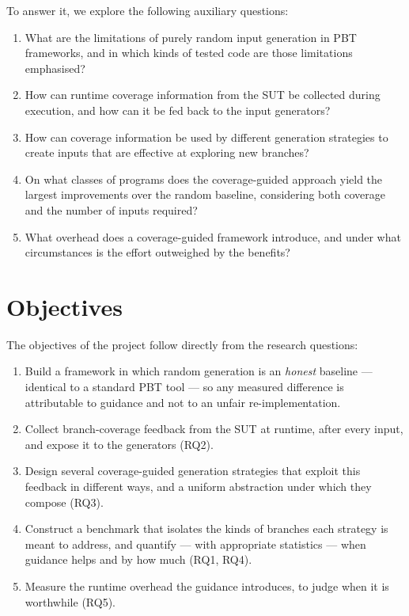 \documentclass[11pt,a4paper]{report}
\begin{document}
To answer it, we explore the following auxiliary questions:
\begin{enumerate}[label=RQ\arabic*., leftmargin=2.2cm]
  \item What are the limitations of purely random input generation in PBT frameworks, and in which kinds of tested code are those limitations emphasised?
  \item How can runtime coverage information from the SUT be collected during execution, and how can it be fed back to the input generators?
  \item How can coverage information be used by different generation strategies to create inputs that are effective at exploring new branches?
  \item On what classes of programs does the coverage-guided approach yield the largest improvements over the random baseline, considering both coverage and the number of inputs required?
  \item What overhead does a coverage-guided framework introduce, and under what circumstances is the effort outweighed by the benefits?
\end{enumerate}

\section{Objectives}
\label{sec:objectives}

The objectives of the project follow directly from the research questions:
\begin{enumerate}[leftmargin=1.6em]
  \item Build a framework in which random generation is an \emph{honest} baseline — identical to a standard PBT tool — so any measured difference is attributable to guidance and not to an unfair re-implementation.
  \item Collect branch-coverage feedback from the SUT at runtime, after every input, and expose it to the generators (RQ2).
  \item Design several coverage-guided generation strategies that exploit this feedback in different ways, and a uniform abstraction under which they compose (RQ3).
  \item Construct a benchmark that isolates the kinds of branches each strategy is meant to address, and quantify — with appropriate statistics — when guidance helps and by how much (RQ1, RQ4).
  \item Measure the runtime overhead the guidance introduces, to judge when it is worthwhile (RQ5).
\end{enumerate}
\end{document}
